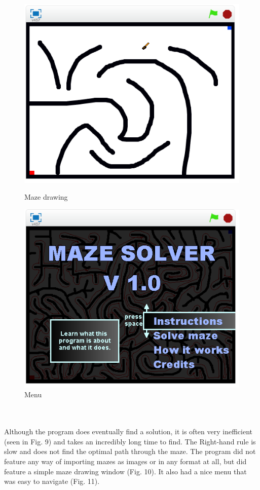 \documentclass[titlepage]{article}
\begin{document}
\begin{figure}[!htb]
  \includegraphics[width=\linewidth]{Drawer.png}
  \caption{Maze drawing}\label{fig:sensor}
\endminipage\hfill
{}
  \includegraphics[width=\linewidth]{Menu.png}
  \caption{Menu}\label{fig:inefficient}
\endminipage\hfill
\end{figure}
\\\\
Although the program does eventually find a solution, it is often very inefficient (seen in Fig. 9) and takes an incredibly long time to find. The Right-hand rule is slow and does not find the optimal path through the maze. The program did not feature any way of importing mazes as images or in any format at all, but did feature a simple maze drawing window (Fig. 10). It also had a nice menu that was easy to navigate (Fig. 11). \cite{scratch}
\end{document}

